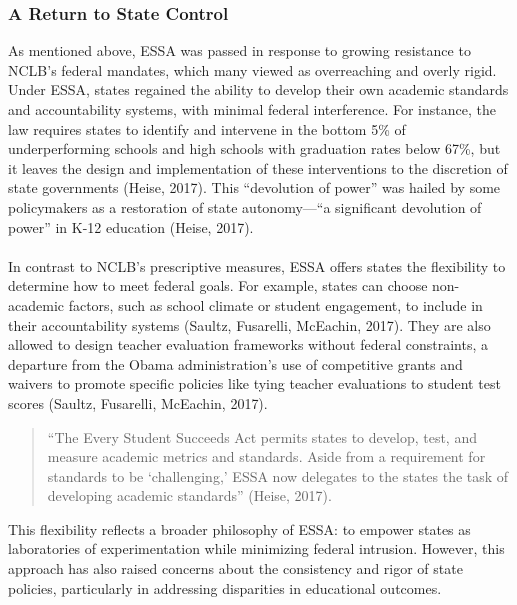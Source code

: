 \documentclass[11pt]{extarticle}
\begin{document}
\subsubsection{A Return to State Control}
As mentioned above, ESSA was passed in response to growing resistance to NCLB’s federal mandates, which many viewed as overreaching and overly rigid. 
Under ESSA, states regained the ability to develop their own academic standards and accountability systems, with minimal federal interference. 
For instance, the law requires states to identify and intervene in the bottom 5\% of underperforming schools and high schools with graduation rates below 67\%, but it leaves the design and implementation of these interventions to the discretion of state governments (Heise, 2017). 
This “devolution of power” was hailed by some policymakers as a restoration of state autonomy---“a significant devolution of power” in K-12 education (Heise, 2017).\\
\\
In contrast to NCLB’s prescriptive measures, ESSA offers states the flexibility to determine how to meet federal goals. 
For example, states can choose non-academic factors, such as school climate or student engagement, to include in their accountability systems (Saultz, Fusarelli, McEachin, 2017). They are also allowed to design teacher evaluation frameworks without federal constraints, a departure from the Obama administration’s use of competitive grants and waivers to promote specific policies like tying teacher evaluations to student test scores (Saultz, Fusarelli, McEachin, 2017).
\begin{quote}
  “The Every Student Succeeds Act permits states to develop, test, and measure academic metrics and standards. Aside from a requirement for standards to be ‘challenging,’ ESSA now delegates to the states the task of developing academic standards” (Heise, 2017).
\end{quote}
This flexibility reflects a broader philosophy of ESSA: to empower states as laboratories of experimentation while minimizing federal intrusion. However, this approach has also raised concerns about the consistency and rigor of state policies, particularly in addressing disparities in educational outcomes.
\end{document}
